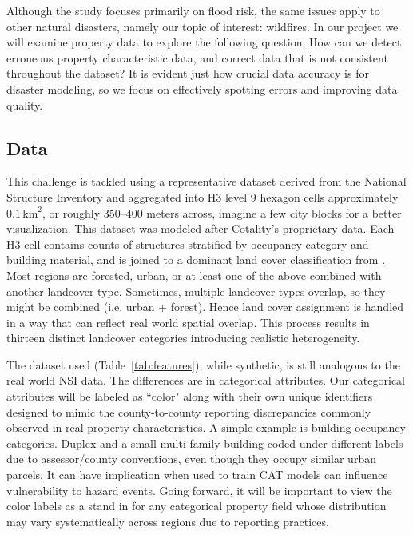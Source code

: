 \documentclass[11pt,letterpaper]{article}
\begin{document}
Although the \cite{pollacknsi} study focuses primarily on flood risk, the same issues apply to other natural disasters, namely our topic of interest: wildfires. In our project we will examine property data to explore the following question: How can we detect erroneous property characteristic data, and correct data that is not consistent throughout the dataset? It is evident just how crucial data accuracy is for disaster modeling, so we focus on effectively spotting errors and improving data quality.

\subsection{Data}

This challenge is tackled using a representative dataset derived from the National Structure Inventory \citep{nsi_usace} and aggregated into H3 \citep{uberh3} level 9 hexagon cells approximately $0.1\,\text{km}^2$, or roughly 350–400 meters across, imagine a few city blocks for a better visualization. This dataset was modeled after Cotality's proprietary data. Each H3 cell contains counts of structures stratified by occupancy category and building material, and is joined to a dominant land cover classification from \cite{OvertureMaps}. Most regions are forested, urban, or at least one of the above combined with another landcover type. Sometimes, multiple landcover types overlap, so they might be combined (i.e. urban + forest). Hence land cover assignment is handled in a way that can reflect real world spatial overlap. This process results in thirteen distinct landcover categories introducing realistic heterogeneity. 

The dataset used (Table~\ref{tab:features}), while synthetic, is still analogous to the real world NSI data. The differences are in categorical attributes. Our categorical attributes will be labeled as “color" along with their own unique identifiers designed to mimic the county-to-county reporting discrepancies commonly observed in real property characteristics. A simple example is building occupancy categories. Duplex and a small multi-family building coded under different labels due to assessor/county conventions, even though they occupy similar urban parcels, It can have implication when used to train CAT models can influence vulnerability to hazard events. Going forward, it will be important to view the color labels as a stand in for any categorical property field whose distribution may vary systematically across regions due to reporting practices.
\end{document}

